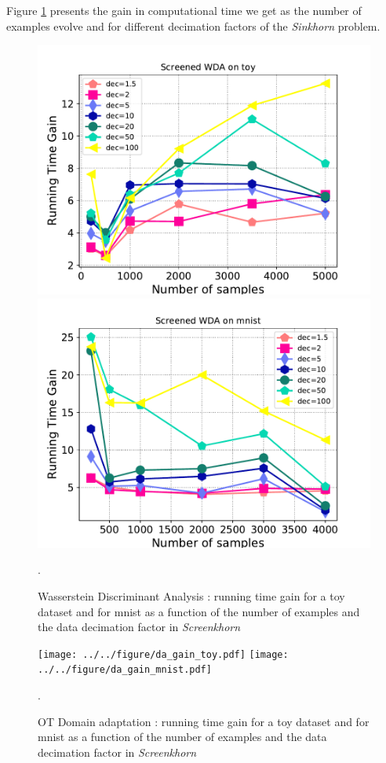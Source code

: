 Figure \ref{fig:wda} presents the gain in computational time we get as the number
of examples evolve and for different decimation factors of the \emph{Sinkhorn} problem.

\begin{figure}[t]
	\centering
	\includegraphics[width=6.cm]{../../figure/wda_gain_toy.pdf}
\includegraphics[width=6.cm]{../../figure/wda_gain_mnist.pdf}
	\caption{Wasserstein Discriminant Analysis : running time gain for a toy dataset and for mnist as a function of the number of examples and the data decimation factor in \emph{Screenkhorn}}.
	\label{fig:wda}
\end{figure}
\begin{figure}[t]
	\centering
	\texttt{[image: ../../figure/da\_gain\_toy.pdf]}
	\texttt{[image: ../../figure/da\_gain\_mnist.pdf]}
	\caption{OT Domain adaptation : running time gain for a toy dataset and for mnist as a function of the number of examples and the data decimation factor in \emph{Screenkhorn}}.
	\label{fig:otda}
\end{figure}



